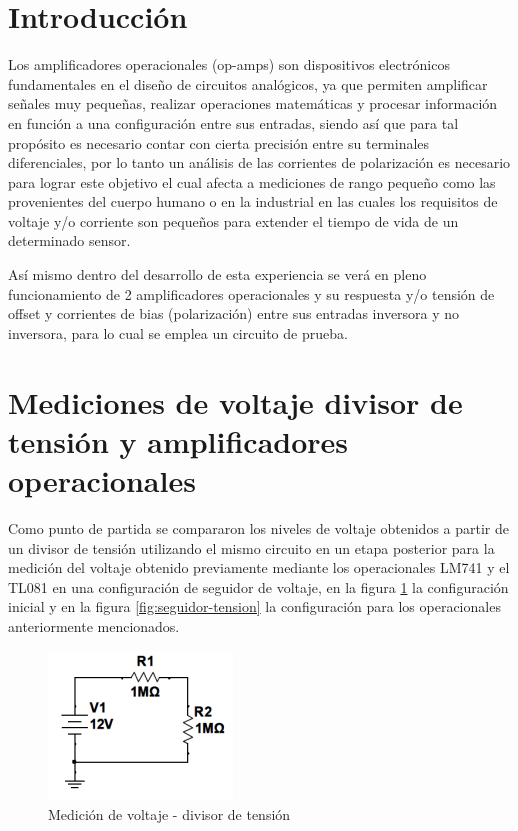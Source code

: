 
\section*{Introducción}
Los amplificadores operacionales (op-amps) son dispositivos electrónicos fundamentales en el diseño de circuitos analógicos, ya que permiten amplificar señales muy pequeñas, realizar operaciones matemáticas y procesar información en función a una configuración entre sus entradas, siendo así que para tal propósito es necesario contar con cierta precisión entre su terminales diferenciales, por lo tanto un análisis de las corrientes de polarización es necesario para lograr este objetivo el cual afecta a mediciones de rango pequeño como las provenientes del cuerpo humano o en la industrial en las cuales los requisitos de voltaje y/o corriente son pequeños para extender el tiempo de vida de un determinado sensor.

Así mismo dentro del desarrollo de esta experiencia se verá en pleno funcionamiento de 2 amplificadores operacionales y su respuesta y/o tensión de offset y corrientes de bias (polarización) entre sus entradas inversora y no inversora, para lo cual se emplea un circuito de prueba.


\section{ Mediciones de voltaje divisor de tensión y amplificadores operacionales}

Como punto de partida se compararon los niveles de voltaje obtenidos a partir de un divisor de tensión utilizando el mismo circuito en un etapa posterior para la medición del voltaje obtenido previamente mediante los operacionales LM741 y el TL081 en una configuración de seguidor de voltaje, en la figura \ref{fig:divisor-tension} la configuración inicial y en la figura \ref{fig:seguidor-tension} la configuración para los operacionales anteriormente mencionados.

\begin{figure}[h]
	\centering
	\includegraphics[width=0.3\linewidth]{media/divisor-tension}
	\caption{Medición de voltaje - divisor de tensión}
	\label{fig:divisor-tension}
\end{figure}

